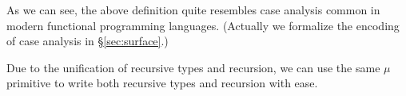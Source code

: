 As we can see, the above definition quite resembles case analysis common in modern functional programming languages. (Actually we formalize the encoding of case analysis in \S\ref{sec:surface}.)

Due to the unification of recursive types and recursion, we can use the same $\mu$ primitive to write both recursive types and recursion with ease.

